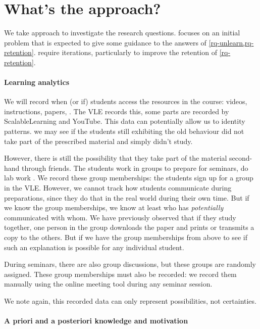 \section{What's the approach?}

We take  approach to investigate the research questions.
 focuses on an initial problem that is expected to give some 
guidance to the answers of \cref{rq-unlearn,rq-retention}.
 require iterations, particularly to improve the 
retention of \cref{rq-retention}.

\paragraph{Learning analytics}

We will record when (or if) students access the resources in the course:
videos,
instructions,
papers,
\etc.
The \ac{VLE} records this, some parts are recorded by ScalableLearning and 
YouTube.
This data can potentially allow us to identity patterns.
\Eg we may see if the students still exhibiting the old behaviour did not take 
part of the prescribed material and simply didn't study.

However, there is still the possibility that they take part of the material 
second-hand through friends.
The students work in groups to prepare for seminars, do lab work \etc.
We record these group memberships: the students sign up for a group in the 
\ac{VLE}.
However, we cannot track how students communicate during preparations, since 
they do that in the real world during their own time.
But if we know the group memberships, we know at least who has 
\emph{potentially} communicated with whom.
We have previously observed that if they study together, one person in the 
group downloads the paper and prints or transmits a copy to the others.
But if we have the group memberships from above to see if such an explanation 
is possible for any individual student.

During seminars, there are also group discussions, but these groups are 
randomly assigned.
These group memberships must also be recorded: we record them manually using 
the online meeting tool during any seminar session.

We note again, this recorded data can only represent possibilities, not 
certainties.

\paragraph{A priori and a posteriori knowledge and motivation}

